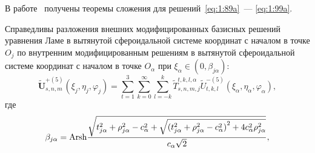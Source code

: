 В работе~\cite{Nikolaev2014-1} получены теоремы сложения для решений~\eqref{eq:1:89a}~--- \eqref{eq:1:99a}.

\begin{theorem}
Справедливы разложения внешних модифицированных базисных решений уравнения Ламе в вытянутой сфероидальной системе координат с началом в точке $O_j$ по внутренним модифицированным решениям в вытянутой сфероидальной системе координат с началом в точке $O_\alpha$ при $\xi_\alpha\in(0,\beta_{j\alpha})$:
\begin{equation}
\mathbf{\tilde U}_{s,n,m}^{+(5)}(\xi_j,\eta_j,\varphi_j)=\sum\limits_{t=1}^3\sum\limits_{k=0}^\infty\sum\limits_{l=-k}^k\tilde T_{s,n,m,j}^{t,k,l,\alpha}\tilde U_{t,k,l}^{-(5)}(\xi_\alpha,\eta_\alpha,\varphi_\alpha),
\label{eq:1:100t}
\end{equation}
\noindent где
\begin{equation*}
\beta_{j\alpha}={\rm{Arsh}}\frac{{\sqrt {t_{j\alpha }^2 + \rho _{j\alpha }^2 - c_\alpha ^2 + \sqrt {{{(t_{j\alpha }^2 + \rho _{j\alpha }^2 - c_\alpha ^2)}^2} + 4c_\alpha ^2\rho _{j\alpha }^2} } }}{{{c_\alpha }\sqrt 2 }},
\end{equation*}


\end{theorem}
